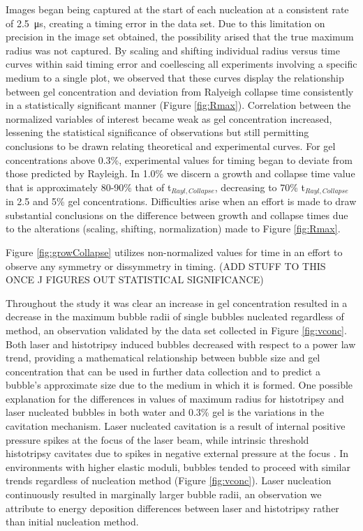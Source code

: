 \documentclass[prl,aps,epsf,twocolumn,superscriptaddress]{revtex4-1}
\begin{document}
Images began being captured at the start of each nucleation at a consistent rate of \SI{2.5}{\us}, creating a timing error in the data set. Due to this limitation on precision in the image set obtained, the possibility arised that the true maximum radius was not captured. By scaling and shifting individual radius versus time curves within said timing error and coellescing all experiments involving a specific medium to a single plot, we observed that these curves display the relationship between gel concentration and deviation from Ralyeigh collapse time consistently in a statistically significant manner (Figure \ref{fig:Rmax}). Correlation between the normalized variables of interest became weak as gel concentration increased, lessening the statistical significance of observations but still permitting conclusions to be drawn relating theoretical and experimental curves. For gel concentrations above 0.3\%, experimental values for timing began to deviate from those predicted by Rayleigh. In 1.0\% we discern a growth and collapse time value that is approximately 80-90\% that of t$_{Rayl,Collapse}$, decreasing to 70\% t$_{Rayl,Collapse}$ in 2.5 and 5\% gel concentrations. Difficulties arise when an effort is made to draw substantial conclusions on the difference between growth and collapse times due to the alterations (scaling, shifting, normalization) made to Figure \ref{fig:Rmax}. 

Figure \ref{fig:growCollapse} utilizes non-normalized values for time in an effort to observe any symmetry or dissymmetry in timing. (ADD STUFF TO THIS ONCE J FIGURES OUT STATISTICAL SIGNIFICANCE)

Throughout the study it was clear an increase in gel concentration resulted in a decrease in the maximum bubble radii of single bubbles nucleated regardless of method, an observation validated by the data set collected in Figure \ref{fig:vconc}. Both laser and histotripsy induced bubbles decreased with respect to a power law trend, providing a mathematical relationship between bubble size and gel concentration that can be used in further data collection and to predict a bubble's approximate size due to the medium in which it is formed. One possible explanation for the differences in values of maximum radius for histotripsy and laser nucleated bubbles in both water and 0.3\% gel is the variations in the cavitation mechanism. Laser nucleated cavitation is a result of internal positive pressure spikes at the focus of the laser beam, while intrinsic threshold histotripsy cavitates due to spikes in negative external pressure at the focus \cite{sukovich2011pressure}. In environments with higher elastic moduli, bubbles tended to proceed with similar trends regardless of nucleation method (Figure \ref{fig:vconc}). Laser nucleation continuously resulted in marginally larger bubble radii, an observation we attribute to energy deposition differences between laser and histotripsy rather than initial nucleation method. 
\end{document}
